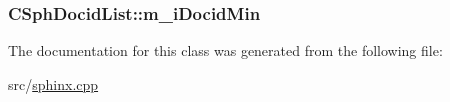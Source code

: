 \hypertarget{classCSphDocidList_a1e1d6fd324395f9037e7c73545773f2e}{
\subsubsection[{m\-\_\-i\-Docid\-Min}]{ C\-Sph\-Docid\-List\-::m\-\_\-i\-Docid\-Min\hspace{0.3cm}{\ttfamily [private]}}}\label{classCSphDocidList_a1e1d6fd324395f9037e7c73545773f2e}


The documentation for this class was generated from the following file\-:\begin{DoxyCompactItemize}
\item 
src/\hyperlink{sphinx_8cpp}{sphinx.\-cpp}\end{DoxyCompactItemize}

